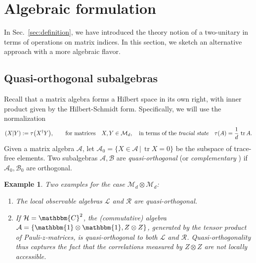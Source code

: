 \documentclass[aps,nofootinbib,floatfix,a4paper]{revtex4}
\newtheorem{example}[theorem]{Example}
\newcommand{\1}{\mbox{$\mathbf{1}$}}
\def\CC{\mathbbm{C}}
\def\H{\mathcal{H}}
\def\A{\mathcal{A}}
\def\B{\mathcal{B}}
\def\M{\mathcal{M}}
\def\R{\mathcal{R}}
\def\Id{\mathbbm{1}}
\DeclareMathOperator{\tr}{tr}
\begin{document}
\section{Algebraic formulation}
\label{sec:algebra}


In Sec.~\ref{sec:definition}, we have introduced the theory notion of a two-unitary in terms of operations on matrix indices.
In this section, we sketch an alternative approach with a more algebraic flavor.


\subsection{Quasi-orthogonal subalgebras}

Recall that a matrix algebra forms a Hilbert space in its own right, with inner product given by the Hilbert-Schmidt form.
Specifically, we will use the normalization
\begin{align}\label{eqn:tracial}
	(X|Y) := 
	\tau
	\big(
		X^\dagger Y
	\big),
	\qquad
	\text{for matrices}
	\quad
	X, Y \in \M_d,
	\quad
	\text{in terms of the \emph{tracial state}}
	\quad
	\tau(A)
	=
	\frac1{d}\,
	\tr A.
\end{align}
%
Given a matrix algebra $\A$, let $\mathcal{A}_0=\{ X \in \A \,|\, \tr X = 0\}$ be the subspace of trace-free elements.
Two subalgebras $\mathcal{A}, \mathcal{B}$ are \emph{quasi-orthogonal} 
\cite{Ohno2007QuasiOrthogonal, ohno2008quasi, weiner2010quasi}
(or \emph{complementary} \cite{Petz2007Complementary, petz2010algebraic})
if $\A_0, \B_0$ are 
orthogonal. 

\begin{example}
	Two examples for the case 
	$\M_d\otimes \M_d$:
	\begin{enumerate}
		\item
		The local observable algebras
		$\mathcal{L}$ and $\R$ are quasi-orthogonal.
		\item
		If $\H=\CC^2$, the (commutative) algebra $\A=\{\Id\otimes \Id, Z\otimes Z\}$,
		generated by the tensor product of Pauli-$z$-matrices,
		is quasi-orthogonal to both $\mathcal{L}$ and $\R$.
		Quasi-orthogonality thus captures the fact that the correlations measured by $Z\otimes Z$ are not locally accessible.
	\end{enumerate}
\end{example}
\end{document}
